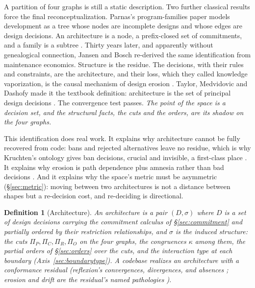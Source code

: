 \documentclass[11pt,oneside]{article}
\newtheorem{defn}{Definition}
\theoremstyle{definition}
\begin{document}
A partition of four graphs is still a static description. Two further classical results force
the final reconceptualization. Parnas's program-families paper models development as a tree
whose nodes are incomplete designs and whose edges are design decisions. An architecture is a
node, a prefix-closed set of commitments, and a family is a subtree \cite{parnas1976}. Thirty
years later, and apparently without genealogical connection, Jansen and Bosch re-derived the
same identification from maintenance economics. Structure is the residue. The decisions, with
their rules and constraints, are the architecture, and their loss, which they called knowledge
vaporization, is the causal mechanism of design erosion \cite{jansenbosch2005,vangurp2002}.
Taylor, Medvidovic and Dashofy made it the textbook definition: architecture is the set of
principal design decisions \cite{taylor2010}. The convergence test passes. \emph{The point of
the space is a decision set, and the structural facts, the cuts and the orders, are its shadow
on the four graphs.}

This identification does real work. It explains why architecture cannot be fully recovered from
code: bans and rejected alternatives leave no residue, which is why Kruchten's ontology gives
ban decisions, crucial and invisible, a first-class place \cite{kruchten2004}. It explains why
erosion is path dependence plus amnesia rather than bad decisions \cite{vangurp2002}. And it
explains why the space's metric must be asymmetric (\S\ref{sec:metric}): moving between two
architectures is not a distance between shapes but a re-decision cost, and re-deciding is
directional.

\begin{defn}[Architecture]\label{def:arch}
An architecture is a pair $(D, \sigma)$ where $D$ is a set of design decisions carrying the
commitment calculus of \S\ref{sec:commitment} and partially ordered by their restriction
relationships, and $\sigma$ is the induced structure: the cuts $\Pi_P, \Pi_C, \Pi_R, \Pi_O$ on
the four graphs, the congruences $\kappa$ among them, the partial orders of \S\ref{sec:orders}
over the cuts, and the interaction type at each boundary (Axis~\ref{sec:boundarytype}). A
codebase realizes an architecture with a conformance residual (reflexion's convergences,
divergences, and absences \cite{murphy1995}; erosion and drift are the residual's named
pathologies \cite{perrywolf1992}).
\end{defn}

\end{document}
